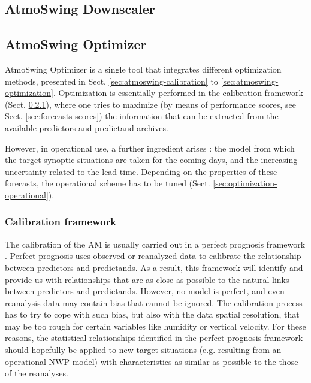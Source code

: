 \documentclass[review]{elsarticle}
\begin{document}
\subsection{AtmoSwing Downscaler}
\label{sec:downscaler}




\subsection{AtmoSwing Optimizer}
\label{sec:optimizer}

AtmoSwing Optimizer is a single tool that integrates different optimization methods, presented in Sect. \ref{sec:atmoswing-calibration} to \ref{sec:atmoswing-optimization}. Optimization is essentially performed in the calibration framework (Sect. \ref{sec:calibration-framework}), where one tries to maximize (by means of performance scores, see Sect. \ref{sec:forecasts-scores}) the information that can be extracted from the available predictors and predictand archives.

However, in operational use, a further ingredient arises : the model from which the target synoptic situations are taken for the coming days, and the increasing uncertainty related to the lead time. Depending on the properties of these forecasts, the operational scheme has to be tuned (Sect. \ref{sec:optimization-operational}).


\subsubsection{Calibration framework}
\label{sec:calibration-framework}

The calibration of the AM is usually carried out in a perfect prognosis \citep{Klein1959} framework \citep{Bontron2004, BenDaoud2010}. Perfect prognosis uses observed or reanalyzed data to calibrate the relationship between predictors and predictands. As a result, this framework will identify and provide us with relationships that are as close as possible to the natural links between predictors and predictands. However, no model is perfect, and even reanalysis data may contain bias that cannot be ignored. The calibration process has to try to cope with such bias, but also with the data spatial resolution, that may be too rough for certain variables like humidity or vertical velocity. For these reasons, the statistical relationships identified in the perfect prognosis framework should hopefully be applied to new target situations (e.g. resulting from an operational NWP model) with characteristics as similar as possible to the those of the reanalyses.
\end{document}
